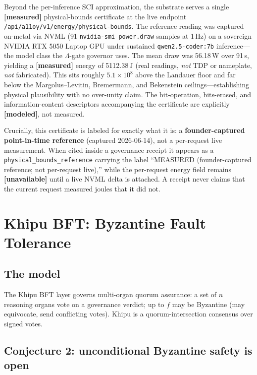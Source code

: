 \documentclass[11pt,letterpaper]{article}
\theoremstyle{definition}
\newcommand{\Lam}{\Lambda}
\newcommand{\measured}{\textbf{[measured]}}
\begin{document}
Beyond the per-inference SCI approximation, the substrate serves a single
\measured{} physical-bounds certificate at the live endpoint
\texttt{/api/a11oy/v1/energy/physical-bounds}.  The reference reading was
captured on-metal via NVML (91 \texttt{nvidia-smi power.draw} samples at
1\,Hz) on a sovereign NVIDIA RTX 5050 Laptop GPU under sustained
\texttt{qwen2.5-coder:7b} inference---the model class the $\Lam$-gate governor
uses.  The mean draw was 56.18\,W over 91\,s, yielding a
\measured{} energy of 5112.38\,J (real readings, \emph{not} TDP or
nameplate, \emph{not} fabricated).  This sits roughly $5.1\times10^{8}$ above
the Landauer floor and far below the Margolus--Levitin, Bremermann, and
Bekenstein ceilings---establishing physical plausibility with no over-unity
claim.  The bit-operation, bits-erased, and information-content descriptors
accompanying the certificate are explicitly \textbf{[modeled]}, not measured.

Crucially, this certificate is labeled for exactly what it is: a
\textbf{founder-captured point-in-time reference} (captured 2026-06-14), not a
per-request live measurement.  When cited inside a governance receipt it appears
as a \texttt{physical\_bounds\_reference} carrying the label ``MEASURED
(founder-captured reference; not per-request live),'' while the per-request
energy field remains \textbf{[unavailable]} until a live NVML delta is attached.  A
receipt never claims that the current request measured joules that it did not.

\section{Khipu BFT: Byzantine Fault Tolerance}
\label{sec:khipu}

\subsection{The model}

The Khipu BFT layer governs multi-organ quorum assurance: a set of $n$ reasoning
organs vote on a governance verdict; up to $f$ may be Byzantine (may equivocate,
send conflicting votes).  Khipu is a quorum-intersection consensus over signed
votes.

\subsection{Conjecture 2: unconditional Byzantine safety is open}
\end{document}
